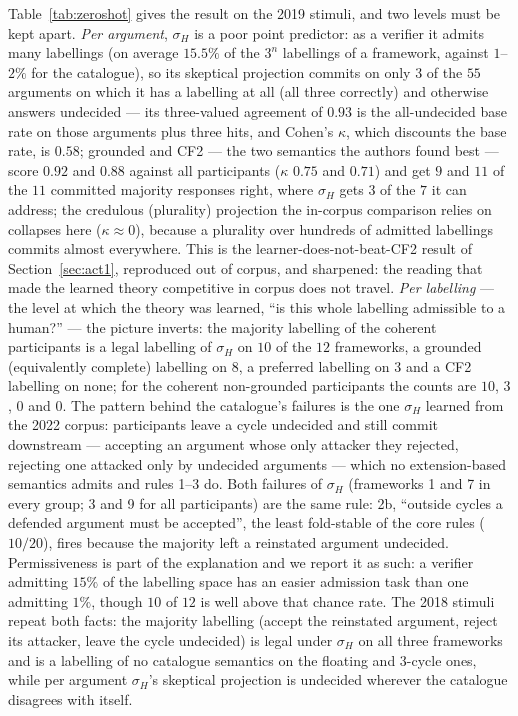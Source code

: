 \documentclass[review,12pt]{elsarticle}
\theoremstyle{definition}
\theoremstyle{remark}
\begin{document}
Table~\ref{tab:zeroshot} gives the result on the 2019 stimuli, and two levels
must be kept apart. \emph{Per argument}, $\sigma_H$ is a poor point predictor:
as a verifier it admits many labellings (on average $15.5\%$ of the $3^n$
labellings of a framework, against $1$--$2\%$ for the catalogue), so its
skeptical projection commits on only $3$ of the $55$ arguments on which it has
a labelling at all (all three correctly) and otherwise answers undecided ---
its three-valued agreement of $0.93$ is the all-undecided base rate on those
arguments plus three hits, and Cohen's $\kappa$, which discounts the base
rate, is $0.58$; grounded and CF2 --- the two semantics the authors found
best --- score $0.92$ and $0.88$ against all participants ($\kappa$ $0.75$
and $0.71$) and get $9$ and $11$ of the $11$ committed majority responses
right, where $\sigma_H$ gets $3$ of the $7$ it can address; the credulous
(plurality) projection the in-corpus comparison relies on collapses here
($\kappa\approx0$), because a plurality over hundreds of admitted labellings
commits almost everywhere. This is the learner-does-not-beat-CF2 result of
Section~\ref{sec:act1}, reproduced out of corpus, and sharpened: the reading
that made the learned theory competitive in corpus does not travel. \emph{Per labelling} ---
the level at which the theory was learned, ``is this whole labelling
admissible to a human?'' --- the picture inverts: the majority labelling of
the coherent participants is a legal labelling of $\sigma_H$ on $10$ of the
$12$ frameworks, a grounded (equivalently complete) labelling on $8$, a
preferred labelling on $3$ and a CF2 labelling on none; for the coherent
non-grounded participants the counts are $10$, $3$, $0$ and $0$. The pattern
behind the catalogue's failures is the one $\sigma_H$ learned from the 2022
corpus: participants leave a cycle undecided and still commit downstream ---
accepting an argument whose only attacker they rejected, rejecting one
attacked only by undecided arguments --- which no extension-based semantics
admits and rules 1--3 do. Both failures of $\sigma_H$ (frameworks 1 and 7 in
every group; 3 and 9 for all participants) are the same rule: 2b, ``outside
cycles a defended argument must be accepted'', the least fold-stable of the
core rules ($10/20$), fires because the majority left a reinstated argument
undecided. Permissiveness is part of the explanation and we report it as
such: a verifier admitting $15\%$ of the labelling space has an easier
admission task than one admitting $1\%$, though $10$ of $12$ is well above
that chance rate. The 2018 stimuli repeat both facts: the majority labelling
(accept the reinstated argument, reject its attacker, leave the cycle
undecided) is legal under $\sigma_H$ on all three frameworks and is a
labelling of no catalogue semantics on the floating and 3-cycle ones, while
per argument $\sigma_H$'s skeptical projection is undecided wherever the
catalogue disagrees with itself.
\end{document}
